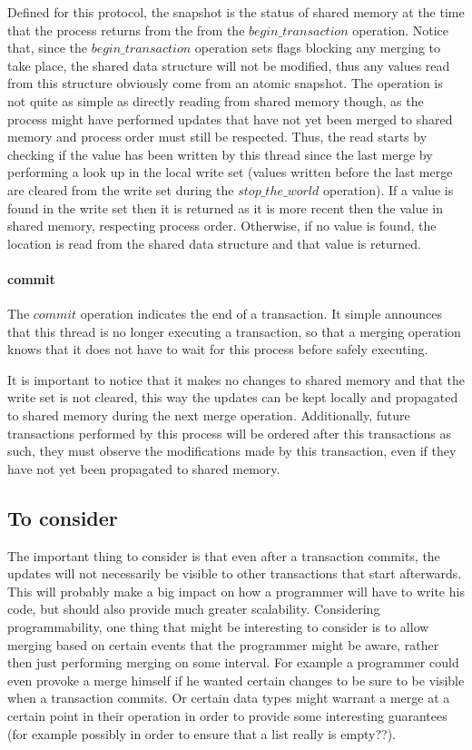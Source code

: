 \documentclass[11pt,letterpaper]{article}
\begin{document}
Defined for this protocol, the snapshot is the status of shared memory at the time that
the process returns from the from the $\mathit{begin\_transaction}$ operation.
Notice that, since the $\mathit{begin\_transaction}$ operation
sets flags blocking any merging to take place, the shared data structure
will not be modified, thus any values read from this structure obviously come from
an atomic snapshot.
The operation is not quite as simple as directly reading from shared memory though,
as the process might have performed updates that have not yet been merged to shared memory
and process order must still be respected.
Thus, the read starts by checking if the value has been written by this
thread since the last merge by performing a look up in the local write set
(values written before the last merge are cleared from the write set during
the $\mathit{stop\_the\_world}$ operation).
If a value is found in the write set then it is returned as it is more recent
then the value in shared memory, respecting process order.
Otherwise, if no value is found,
the location is read from the shared data structure and that value is returned.



\paragraph{commit}
The $\mathit{commit}$ operation indicates the end of a transaction.
It simple announces that this thread is no longer executing a transaction,
so that a merging operation knows that it does not have to wait for this process
before safely executing.

It is important to notice that it makes no changes to shared memory and that the write set is not cleared,
this way the updates can be kept locally and propagated to shared memory during the next merge operation.
Additionally, future transactions performed by this process will be ordered after this
transactions as such, they must observe the modifications made by this transaction, even if they
have not yet been propagated to shared memory.


\subsection{To consider}
The important thing to consider is that even after a transaction commits, the updates will not
necessarily be visible to other transactions that start afterwards.
This will probably make a big impact on how a programmer will have to write his code, but should
also provide much greater scalability.
Considering programmability, one thing that might be interesting to consider is to allow merging
based on certain events that the programmer might be aware, rather then just performing merging
on some interval.
For example a programmer could even provoke a merge himself if he wanted certain changes to be sure
to be visible when a transaction commits.
Or certain data types might warrant a merge at a certain point in their operation in order
to provide some interesting guarantees (for example possibly in order to ensure 
that a list really is empty??).
\end{document}
